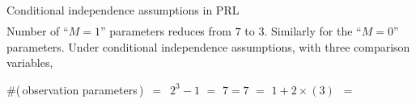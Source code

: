 \begin{frame}{\vskip -0.3cm \Large Conditional independence assumptions in PRL}
{\begin{equation*}
\begin{array}{c}
\end{array}
\end{equation*}
}
\pause
\vskip -0.2cm
Number of ``$M=1$'' parameters reduces {\color{red}from $7$ to $3$}. Similarly for the ``$M=0$'' parameters.
\pause
Under conditional independence assumptions,
\pause
with three comparison variables,
\pause
\begin{center}
\vskip 0.03cm
\#(\,observation parameters\,) \,$=$\, $2^{3}-1$ $=$
\;\;\textbf{\normalsize\color{red}$7$}\pause\textbf{\normalsize\color{red}\;\;$=$\;\;$7$}\;\;
$=$ $1+2 \times\!(3)$ \,$=$\, 
\end{center}

\end{frame}
\normalsize


